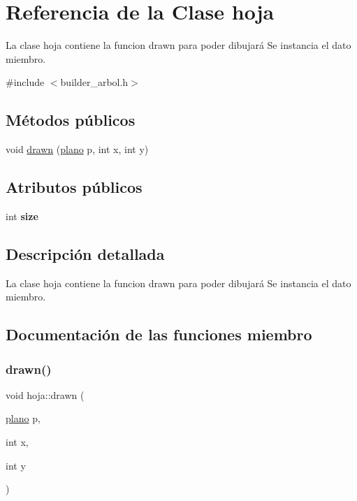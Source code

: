 \hypertarget{classhoja}{}\section{Referencia de la Clase hoja}
\label{classhoja}


La clase hoja contiene la funcion drawn para poder dibujará  Se instancia el dato miembro.  




{\ttfamily \#include $<$builder\+\_\+arbol.\+h$>$}

\subsection*{Métodos públicos}
\begin{DoxyCompactItemize}
\item 
void \hyperlink{classhoja_a4210f1a7c6235aced08fc9817085dbe4}{drawn} (\hyperlink{classplano}{plano} p, int x, int y)
\end{DoxyCompactItemize}
\subsection*{Atributos públicos}
\begin{DoxyCompactItemize}
\item 
\mbox{\label{classhoja_a63cb838e5ebc05e229393db711d43afe}} 
int {\bfseries size}
\end{DoxyCompactItemize}


\subsection{Descripción detallada}
La clase hoja contiene la funcion drawn para poder dibujará  Se instancia el dato miembro. 

\subsection{Documentación de las funciones miembro}
\mbox{\label{classhoja_a4210f1a7c6235aced08fc9817085dbe4}} 
\subsubsection{\texorpdfstring{drawn()}{drawn()}}
{\footnotesize\ttfamily void hoja\+::drawn (\begin{DoxyParamCaption}\item[{\hyperlink{classplano}{plano}}]{p,  }\item[{int}]{x,  }\item[{int}]{y }\end{DoxyParamCaption})}

